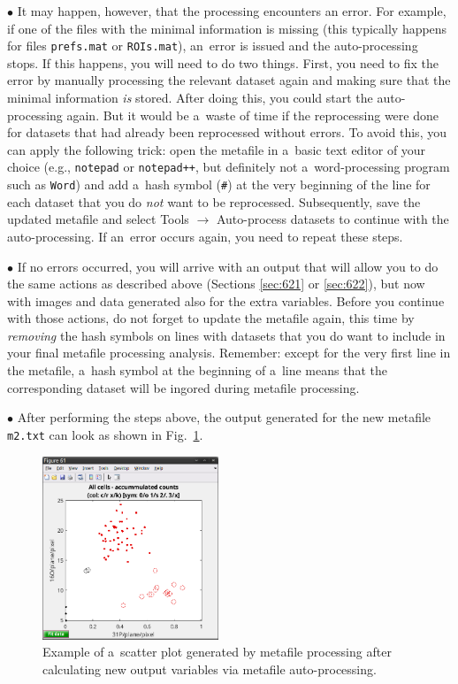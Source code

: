 \documentclass[a4paper, 11pt]{article}
\newcommand{\ttt}[1]{\texttt{#1}}
\newcommand{\lans}[1]{{\color{magenta}#1}}
\newcommand\ra{\rightarrow}
\newcounter{step}
\newcommand\bul{\vskip5pt\noindent$\bullet${ }}
\begin{document}
\bul It may happen, however, that the processing encounters an error. For example, if one of the files with the minimal information is missing (this typically happens for files \ttt{prefs.mat} or \ttt{ROIs.mat}), an~error is issued and the auto-processing stops. If this happens, you will need to do two things. First, you need to fix the error by manually processing the relevant dataset again and making sure that the minimal information \emph{is} stored. After doing this, you could start the auto-processing again. But it would be a~waste of time if the reprocessing were done for datasets that had already been reprocessed without errors. To avoid this, you can apply the following trick: open the metafile in a~basic text editor of your choice (e.g., \ttt{notepad} or \ttt{notepad++}, but definitely not a~word-processing program such as \ttt{Word}) and add a~hash symbol (\ttt{\#}) at the very beginning of the line for each dataset that you do \emph{not} want to be reprocessed. Subsequently, save the updated metafile and select \lans{Tools} $\ra$ \lans{Auto-process datasets} to continue with the auto-processing. If an~error occurs again, you need to repeat these steps.

\bul If no errors occurred, you will arrive with an output that will allow you to do the same actions as described above (Sections \ref{sec:621} or \ref{sec:622}), but now with images and data generated also for the extra variables. Before you continue with those actions, do not forget to update the metafile again, this time by \emph{removing} the hash symbols on lines with datasets that you do want to include in your final metafile processing analysis. Remember: except for the very first line in the metafile, a~hash symbol at the beginning of a~line means that the corresponding dataset will be ingored during metafile processing.

\bul After performing the steps above, the output generated for the new metafile \ttt{m2.txt} can look as shown in Fig.~\ref{fig:metafile-scatterplot2}.

\begin{figure}[!ht]
\centering
\includegraphics[width=0.47\textwidth]{figs3/LANS-metafile-scatterplot3}
\caption{\label{fig:metafile-scatterplot2}%
Example of a~scatter plot generated by metafile processing after calculating new output variables via metafile auto-processing.}
\end{figure}
\end{document}
